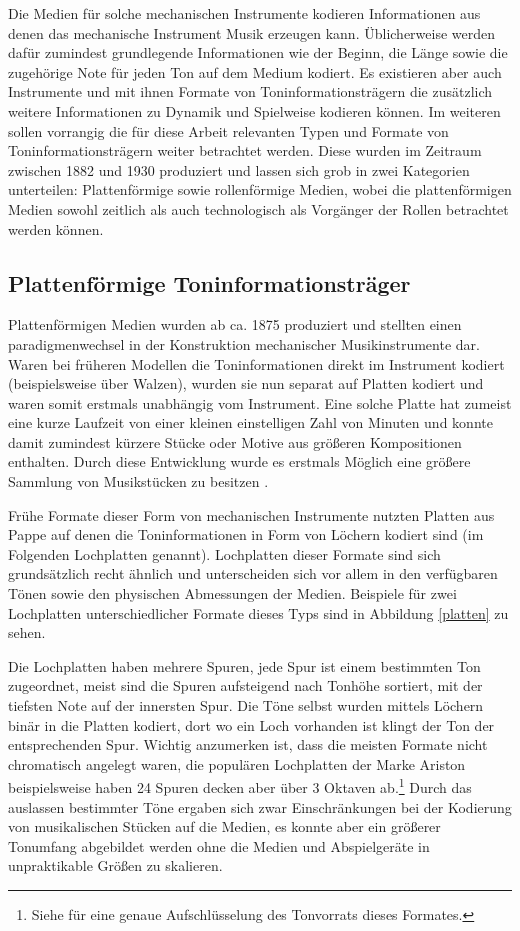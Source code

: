 Die Medien für solche mechanischen Instrumente kodieren Informationen aus denen das mechanische Instrument Musik erzeugen kann.
Üblicherweise werden dafür zumindest grundlegende Informationen wie der Beginn, die Länge sowie die zugehörige Note für jeden Ton auf dem Medium kodiert.
Es existieren aber auch Instrumente und mit ihnen Formate von Toninformationsträgern die zusätzlich weitere Informationen zu Dynamik und Spielweise kodieren können.
Im weiteren sollen vorrangig die für diese Arbeit relevanten Typen und Formate von Toninformationsträgern weiter betrachtet werden.
Diese wurden im Zeitraum zwischen 1882 und 1930 produziert und lassen sich grob in zwei Kategorien unterteilen: Plattenförmige sowie rollenförmige Medien, wobei die plattenförmigen Medien sowohl zeitlich als auch technologisch als Vorgänger der Rollen betrachtet werden können.

\subsection{Plattenförmige Toninformationsträger}

Plattenförmigen Medien wurden ab ca. 1875 produziert und stellten einen paradigmenwechsel in der Konstruktion mechanischer Musikinstrumente dar.
Waren bei früheren Modellen die Toninformationen direkt im Instrument kodiert (beispielsweise über Walzen), wurden sie nun separat auf Platten kodiert und waren somit erstmals unabhängig vom Instrument.
Eine solche Platte hat zumeist eine kurze Laufzeit von einer kleinen einstelligen Zahl von Minuten und konnte damit zumindest kürzere Stücke oder Motive aus größeren Kompositionen enthalten.
Durch diese Entwicklung wurde es erstmals Möglich eine größere Sammlung von Musikstücken zu besitzen \parencite[III.5.c. Plattenspieldosen und Drehinstrumente]{mgg_mechanische}.

Frühe Formate dieser Form von mechanischen Instrumente nutzten Platten aus Pappe auf denen die Toninformationen in Form von Löchern kodiert sind (im Folgenden Lochplatten genannt).
Lochplatten dieser Formate sind sich grundsätzlich recht ähnlich und unterscheiden sich vor allem in den verfügbaren Tönen sowie den physischen Abmessungen der Medien.
Beispiele für zwei Lochplatten unterschiedlicher Formate dieses Typs sind in Abbildung \ref{platten} zu sehen.

Die Lochplatten haben mehrere Spuren, jede Spur ist einem bestimmten Ton zugeordnet, meist sind die Spuren aufsteigend nach Tonhöhe sortiert, mit der tiefsten Note auf der innersten Spur.
Die Töne selbst wurden mittels Löchern binär in die Platten kodiert, dort wo ein Loch vorhanden ist klingt der Ton der entsprechenden Spur.
Wichtig anzumerken ist, dass die meisten Formate nicht chromatisch angelegt waren, die populären Lochplatten der Marke Ariston beispielsweise haben 24 Spuren decken aber über 3 Oktaven ab.\footnote{Siehe \textcite[]{mxp_2003520} für eine genaue Aufschlüsselung des Tonvorrats dieses Formates.}
Durch das auslassen bestimmter Töne ergaben sich zwar Einschränkungen bei der Kodierung von musikalischen Stücken auf die Medien, es konnte aber ein größerer Tonumfang abgebildet werden ohne die Medien und Abspielgeräte in unpraktikable Größen zu skalieren.

